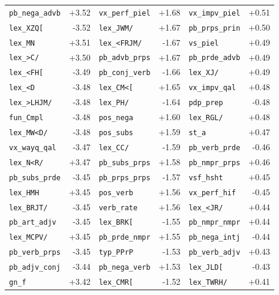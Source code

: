 \begin{longtable}{lrlrlr}
\texttt{pb\_nega\_advb} & +3.52 & \texttt{vx\_perf\_piel} & +1.68 & \texttt{vx\_impv\_piel} & +0.51 \\
\texttt{lex\_XZQ[} & -3.52 & \texttt{lex\_JWM/} & +1.67 & \texttt{pb\_prps\_prin} & +0.50 \\
\texttt{lex\_MN} & +3.51 & \texttt{lex\_\textless{}FRJM/} & -1.67 & \texttt{vs\_piel} & +0.49 \\
\texttt{lex\_\textgreater{}C/} & +3.50 & \texttt{pb\_advb\_prps} & +1.67 & \texttt{pb\_prde\_advb} & +0.49 \\
\texttt{lex\_\textless{}FH[} & -3.49 & \texttt{pb\_conj\_verb} & -1.66 & \texttt{lex\_XJ/} & +0.49 \\
\texttt{lex\_\textless{}D} & -3.48 & \texttt{lex\_CM\textless{}[} & +1.65 & \texttt{vx\_impv\_qal} & +0.48 \\
\texttt{lex\_\textgreater{}LHJM/} & -3.48 & \texttt{lex\_PH/} & -1.64 & \texttt{pdp\_prep} & -0.48 \\
\texttt{fun\_Cmpl} & -3.48 & \texttt{pos\_nega} & +1.60 & \texttt{lex\_RGL/} & +0.48 \\
\texttt{lex\_MW\textless{}D/} & -3.48 & \texttt{pos\_subs} & +1.59 & \texttt{st\_a} & +0.47 \\
\texttt{vx\_wayq\_qal} & -3.47 & \texttt{lex\_CC/} & -1.59 & \texttt{pb\_verb\_prde} & -0.46 \\
\texttt{lex\_N\textless{}R/} & +3.47 & \texttt{pb\_subs\_prps} & +1.58 & \texttt{pb\_nmpr\_prps} & +0.46 \\
\texttt{pb\_subs\_prde} & -3.45 & \texttt{pb\_prps\_prps} & -1.57 & \texttt{vsf\_hsht} & +0.45 \\
\texttt{lex\_HMH} & +3.45 & \texttt{pos\_verb} & +1.56 & \texttt{vx\_perf\_hif} & -0.45 \\
\texttt{lex\_BRJT/} & -3.45 & \texttt{verb\_rate} & +1.56 & \texttt{lex\_\textless{}JR/} & +0.44 \\
\texttt{pb\_art\_adjv} & -3.45 & \texttt{lex\_BRK[} & -1.55 & \texttt{pb\_nmpr\_nmpr} & +0.44 \\
\texttt{lex\_MCPV/} & +3.45 & \texttt{pb\_prde\_nmpr} & +1.55 & \texttt{pb\_nega\_intj} & -0.44 \\
\texttt{pb\_verb\_prps} & -3.45 & \texttt{typ\_PPrP} & -1.53 & \texttt{pb\_verb\_adjv} & +0.43 \\
\texttt{pb\_adjv\_conj} & -3.44 & \texttt{pb\_nega\_verb} & +1.53 & \texttt{lex\_JLD[} & -0.43 \\
\texttt{gn\_f} & +3.42 & \texttt{lex\_CMR[} & -1.52 & \texttt{lex\_TWRH/} & +0.41 \\

\end{longtable}
